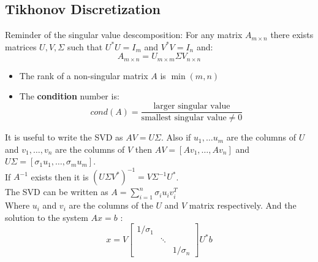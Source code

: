 \subsection{Tikhonov Discretization}
Reminder of the singular value descomposition: For any matrix $A_{m\times n} $ there exists matrices $U,V,\Sigma$ such that $U^*U=I_m$ and $V^*V=I_n$ and:
$$A_{m\times n}= U_{m\times m}\Sigma V_{n\times n} $$
\begin{remarks}
\begin{itemize}
\item The rank of  a non-singular matrix $A$ is $\min(m,n)$ 
\item The \textbf{condition} number is:
$$cond(A)=\frac{\text{larger singular value}}{\text{smallest singular value}\neq 0}$$
\end{itemize}
\end{remarks}
It is useful to write the SVD as $AV=U\Sigma$. Also if $u_1,\ldots u_m$ are the columns of $U$ and $v_1,\ldots, v_n$ are the columns of $V$ then $AV=[Av_1,\ldots, Av_n]$ and $U\Sigma = [\sigma_1 u_1,\ldots, \sigma_m u_m] $.\\
If $A ^{-1} $ exists then it is $(U\Sigma V^*)^{-1} = V\Sigma ^{-1} U^*$.\\
The SVD can be written as $A=\sum_{i=1}^n \sigma_iu_iv_i^T$ \\
Where $u_i$ and $v_i$ are the columns of the $U$ and $V$ matrix respectively.
And the solution to the system $Ax=b$ :
$$ x= V\begin{bmatrix} 1/\sigma_1 &   &   \\    & \ddots &  \\   &   &  1/\sigma_n \end{bmatrix} U^*b$$

